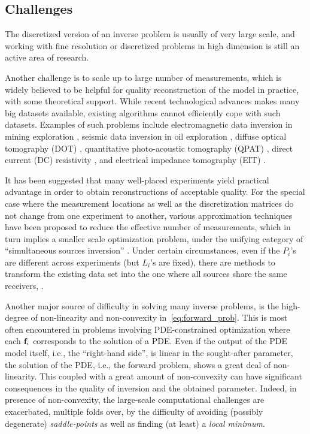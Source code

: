 \subsection{Challenges}
\label{sec:challenges}

The discretized version of an inverse problem is usually of very large scale,
and working with fine resolution or discretized problems in high dimension is
still an active area of research.

Another challenge is to scale up to large number of measurements, which is
widely believed to be helpful for quality reconstruction of the model in
practice, with some theoretical support.
While recent technological advances makes many big datasets available, existing
algorithms cannot efficiently cope with such datasets.
Examples of such problems include electromagnetic data inversion in mining
exploration \cite{na,dmr,haasol,olhash}, seismic data inversion in oil
exploration \cite{fichtner,hel,rnkkda}, diffuse optical tomography (DOT)
\cite{arridge1999optical,boas}, quantitative photo-acoustic tomography (QPAT)
\cite{gaooscher,yuan}, direct current (DC) resistivity
\cite{smvoz,pihakn,haheas,HaberChungHermann2010,doas12}, 
and electrical impedance tomography (EIT) \cite{bbp,cin,van2013lost}.

It has been suggested that many well-placed experiments yield practical advantage in order to obtain reconstructions of acceptable quality. 
For the special case where the measurement locations as well as the discretization matrices do not change from one experiment to another, various approximation techniques have been proposed to reduce the effective number of measurements, which in turn implies a smaller scale optimization problem, under the unifying category of ``simultaneous sources inversion'' \cite{rodoas1,roszas,roosta2015randomized,haber2014simultaneous,kumar2014GEOPemc}. Under certain circumstances, even if the $P_{i}$'s are different across experiments (but $ L_{i} $'s are fixed), there are methods to transform the existing data set 
into the one where all sources share the same receivers, \cite{rodoas2}. 

\medskip{}
Another major source of difficulty in solving many inverse problems, is the high-degree of non-linearity and non-convexity in~\eqref{eq:forward_prob}. This is most often encountered in problems involving PDE-constrained optimization where each $ {\bf f}_{i} $ corresponds to the solution of a PDE. Even if the output of the PDE model itself, i.e., the ``right-hand side'', is linear in the sought-after parameter, the solution of the PDE, i.e., the forward problem, shows a great deal of non-linearity. This coupled with a great amount of non-convexity can have significant consequences in the quality of inversion and the obtained parameter. Indeed, in presence of non-convexity, the large-scale computational challenges are exacerbated, multiple folds over, by the difficulty of avoiding (possibly degenerate) \emph{saddle-points} as well as finding (at least) a \emph{local minimum}. 

